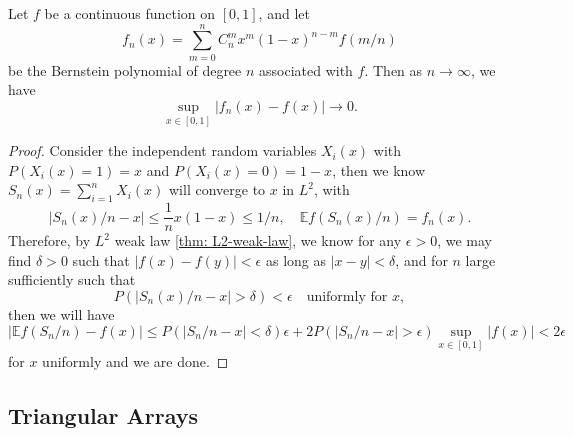 \begin{corollary}
    Let $f$ be a continuous function on $[0,1]$, and let
    \[f_n(x) = \sum\limits^n_{m=0} C_n^m x^m(1 - x)^{n-m}f(m/n)\]
    be the Bernstein polynomial of degree $n$ associated with $f$. Then as $n \to\infty$, we have
    \[\sup_{x\in[0,1]} |f_n(x) - f(x)| \to 0.\]
\end{corollary}
\begin{proof}
    Consider the independent random variables $X_i(x)$ with $P(X_i(x) = 1) = x$ and $P(X_i(x) = 0) = 1-x$, then we know $S_n(x) = \sum\limits_{i = 1}^n X_i(x)$ will converge to $x$ in $L^2$, with
    \[
    |S_n(x)/n - x| \leq \dfrac{1}{n}x(1-x) \leq 1/n,\quad\mathbb{E} f(S_n(x)/n) = f_n(x).
    \]
    Therefore, by $L^2$ weak law \ref{thm: L2-weak-law}, we know for any $\epsilon > 0$, we may find $\delta > 0$ such that $|f(x) - f(y)| < \epsilon$ as long as $|x-y| < \delta$, and for $n$ large sufficiently such that
    \[P(|S_n(x)/n - x| > \delta )< \epsilon\quad\text{uniformly for }x,\]
    then we will have
    \[
    \left|\mathbb{E}f(S_n/n) - f(x)\right| \leq P(\left|S_n/n - x\right| < \delta)\epsilon + 2P(|S_n/n - x|>\epsilon)\sup_{x\in[0,1]}|f(x)| < 2\epsilon
    \]
    for $x$ uniformly and we are done.
\end{proof}

\subsection{Triangular Arrays}